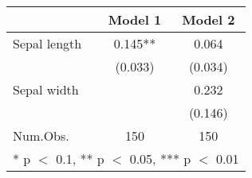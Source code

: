 \begin{table}
\centering
\begin{tabular}[t]{lcc}
\toprule
  & Model 1 & Model 2\\
\midrule
Sepal length & \num{0.145}** & \num{0.064}\\
 & (\num{0.033}) & (\num{0.034})\\
Sepal width &  & \num{0.232}\\
 &  & (\num{0.146})\\
\midrule
Num.Obs. & \num{150} & \num{150}\\
\bottomrule
\multicolumn{3}{l}{\rule{0pt}{1em}* p $<$ 0.1, ** p $<$ 0.05, *** p $<$ 0.01}\\
\end{tabular}
\end{table}
